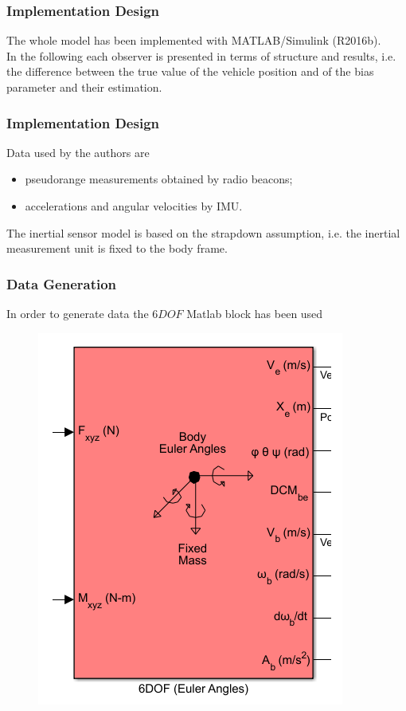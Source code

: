 \documentclass{beamer}
\begin{document}
	\begin{frame}
		\frametitle{Implementation Design}
		The whole model has been implemented with MATLAB/Simulink (R2016b).
		\\
		\vspace{0.5cm}
		In the following each observer is presented in terms of structure and results, i.e. the difference between the true value of the vehicle position and of the bias parameter and their estimation.
		
	\end{frame}
	
	\begin{frame}
		\frametitle{Implementation Design}
		Data used by the authors are \\
		\begin{itemize}
			\item pseudorange measurements obtained by radio beacons;
			\item accelerations and angular velocities by IMU. 
		\end{itemize}
		\vspace{0.5cm}
		The inertial sensor model is based on the strapdown assumption, i.e. the inertial measurement unit is fixed to the body frame.
	\end{frame}
	
	\begin{frame}
		\frametitle{Data Generation}
		In order to generate data the $6DOF$ Matlab block has been used
		\begin{figure}[H]
			\includegraphics[scale=0.4]{6DOF}
		\end{figure}
	\end{frame}
	
\end{document}
